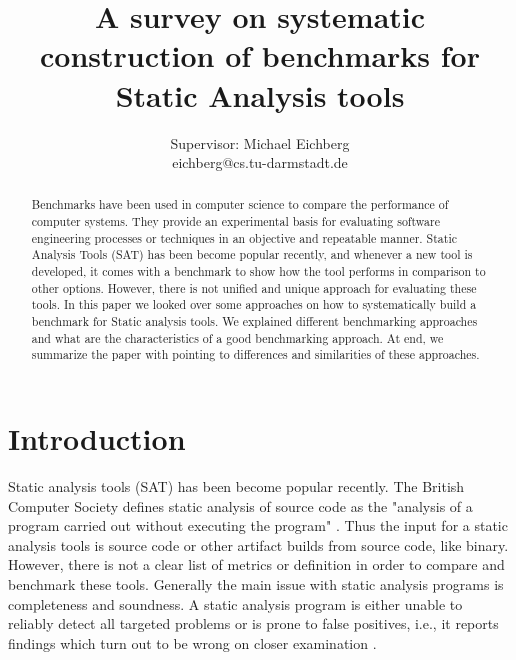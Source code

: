 \documentclass[authoryear,preprint]{sigplanconf}
\begin{document}
	
	\setlength{\pdfpageheight}{\paperheight}
	\setlength{\pdfpagewidth}{\paperwidth}
	
	
	\title{A survey on systematic construction of benchmarks for Static Analysis tools}
	\subtitle{Supervisor: Michael Eichberg \\ eichberg@cs.tu-darmstadt.de}
	
	
	\maketitle


\begin{abstract}
	Benchmarks have been used in computer science to compare the performance of computer systems. They provide an experimental basis for evaluating software engineering processes or techniques in an objective and repeatable manner. Static Analysis Tools (SAT) has been become popular recently, and whenever a new tool is developed, it comes with a benchmark to show how the tool performs in comparison to other options. However, there is not unified and unique approach for evaluating these tools. In this paper we looked over some approaches on how to systematically build a benchmark for Static analysis tools. We explained different benchmarking approaches and what are the characteristics of a good benchmarking approach. At end, we summarize the paper with pointing to differences and similarities of these approaches.
\end{abstract}

\section{Introduction}
\label{sec:introduction}
Static analysis tools (SAT) has been become popular recently. The British Computer Society defines static analysis of source code as the "analysis of a program carried out without executing the program" \cite{Glossary_of_term}. Thus the input for a static analysis tools is source code or other artifact builds from source code, like binary. However, there is not a clear list of metrics or definition in order to compare and benchmark these tools. Generally the main issue with static analysis programs is completeness and soundness. A static analysis program is either unable to reliably detect all targeted problems or is prone to false positives, i.e., it reports findings which turn out to be wrong on closer examination \cite{Scanstud}. 
\end{document}
